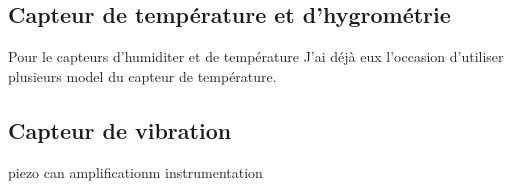 \documentclass[5pt]{article}
\begin{document}
\subsection{Capteur de température et d'hygrométrie }
Pour le capteurs d'humiditer et de température
J'ai déjà eux l'occasion d'utiliser plusieurs model du capteur de température.


\subsection{Capteur de vibration}

piezo can amplificationm instrumentation

\end{document}
